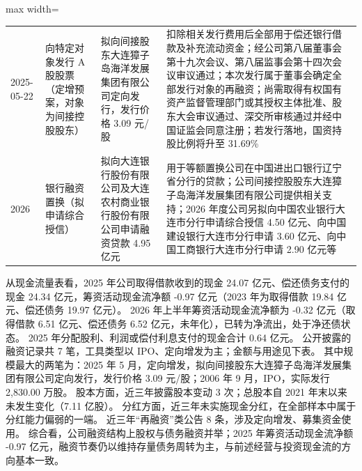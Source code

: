 \begin{center}
\begin{adjustbox}{max width=\textwidth}
\begin{tabular}{@{}p{1.45cm}p{2.55cm}p{4.05cm}p{4.95cm}@{}}
2025-05-22 & 向特定对象发行 A 股股票（定增预案，对象为间接控股股东） & 拟向间接股东大连獐子岛海洋发展集团有限公司定向发行，\allowbreak{}发行价格 3.09 元/\allowbreak{}股 & 扣除相关发行费用后全部用于偿还银行借款及补充流动资金；经公司第八届董事会第十九次会议、\allowbreak{}第八届监事会第十四次会议审议通过；本次发行属于董事会确定全部发行对象的再融资；尚需取得有权国有资产监督管理部门或其授权主体批准、\allowbreak{}股东大会审议通过、\allowbreak{}深交所审核通过并经中国证监会同意注册；若发行落地，\allowbreak{}国资持股比例将升至 31.69\% \\
2026 & 银行融资置换（拟申请综合授信） & 拟向大连银行股份有限公司及大连农村商业银行股份有限公司申请融资贷款 4.95 亿元 & 用于等额置换公司在中国进出口银行辽宁省分行的贷款；公司间接控股股东大连獐子岛海洋发展集团有限公司提供相关支持；2026 年度公司另拟向中国农业银行大连市分行申请综合授信 4.50 亿元、\allowbreak{}向中国建设银行大连市分行申请 3.60 亿元、\allowbreak{}向中国工商银行大连市分行申请 2.90 亿元等 \\
\bottomrule
\end{tabular}
\end{adjustbox}
\end{center}

 从现金流量表看，2025 年公司取得借款收到的现金 24.07 亿元、偿还债务支付的现金 24.34 亿元，筹资活动现金流净额 -0.97 亿元（2023 年为取得借款 19.84 亿元、偿还债务 19.97 亿元）。 2026 年上半年筹资活动现金流净额为 -0.32 亿元（取得借款 6.51 亿元、偿还债务 6.52 亿元，未年化），已转为净流出，处于净还债状态。 2025 年分配股利、利润或偿付利息支付的现金合计 0.64 亿元。 公开披露的融资记录共 7 笔，工具类型以 IPO、定向增发为主；金额与用途见下表。 其中规模最大的两笔为：2025 年 5 月，定向增发，拟向间接股东大连獐子岛海洋发展集团有限公司定向发行，发行价格 3.09 元/股；2006 年 9 月，IPO，实际发行 2,830.00 万股。 股本方面，近三年披露股本变动 3 次；总股本自 2021 年末以来未发生变化（7.11 亿股）。 分红方面，近三年未实施现金分红，在全部样本中属于分红能力偏弱的一端。 近三年“再融资”类公告 8 条，涉及定向增发、募集资金使用。 综合看，公司融资结构上股权与债务融资并举；2025 年筹资活动现金流净额 -0.97 亿元，融资节奏仍以维持存量债务周转为主，与前述经营与投资现金流的方向基本一致。

